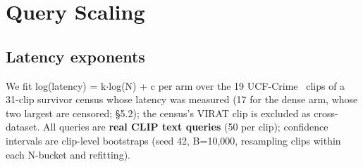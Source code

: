 \documentclass[sigconf,review,anonymous]{acmart}
\begin{document}
\section{Query Scaling}

\subsection{Latency exponents}

We fit log(latency) = k\ensuremath{\cdot}log(N) + c per arm over the 19 UCF-Crime~\cite{sultani2018ucfcrime} clips of a 31-clip survivor census whose latency was measured (17 for the dense arm, whose two largest are censored; §5.2); the census's VIRAT clip is excluded as cross-dataset. All queries are \textbf{real CLIP text
queries} (50 per clip); confidence intervals are clip-level bootstraps (seed 42, B=10,000,
resampling clips within each N-bucket and refitting).
\end{document}
